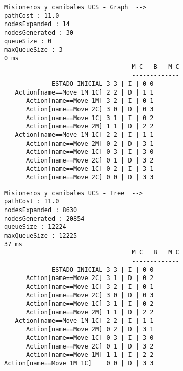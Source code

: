 \documentclass{article}
\begin{document}
\begin{multicols}{2}


\begin{Verbatim}[fontsize=\footnotesize]
Misioneros y canibales UCS - Graph  -->
pathCost : 11.0
nodesExpanded : 14
nodesGenerated : 30
queueSize : 0
maxQueueSize : 3
0 ms
                                   M C   B   M C
                                   -------------
             ESTADO INICIAL	3 3 | I | 0 0
   Action[name==Move 1M 1C]	2 2 | D | 1 1
      Action[name==Move 1M]	3 2 | I | 0 1
      Action[name==Move 2C]	3 0 | D | 0 3
      Action[name==Move 1C]	3 1 | I | 0 2
      Action[name==Move 2M]	1 1 | D | 2 2
   Action[name==Move 1M 1C]	2 2 | I | 1 1
      Action[name==Move 2M]	0 2 | D | 3 1
      Action[name==Move 1C]	0 3 | I | 3 0
      Action[name==Move 2C]	0 1 | D | 3 2
      Action[name==Move 1C]	0 2 | I | 3 1
      Action[name==Move 2C]	0 0 | D | 3 3
\end{Verbatim}
        
\begin{Verbatim}[fontsize=\footnotesize]
Misioneros y canibales UCS - Tree  -->
pathCost : 11.0
nodesExpanded : 8630
nodesGenerated : 20854
queueSize : 12224
maxQueueSize : 12225
37 ms
                                   M C   B   M C
                                   -------------
             ESTADO INICIAL	3 3 | I | 0 0
      Action[name==Move 2C]	3 1 | D | 0 2
      Action[name==Move 1C]	3 2 | I | 0 1
      Action[name==Move 2C]	3 0 | D | 0 3
      Action[name==Move 1C]	3 1 | I | 0 2
      Action[name==Move 2M]	1 1 | D | 2 2
   Action[name==Move 1M 1C]	2 2 | I | 1 1
      Action[name==Move 2M]	0 2 | D | 3 1
      Action[name==Move 1C]	0 3 | I | 3 0
      Action[name==Move 2C]	0 1 | D | 3 2
      Action[name==Move 1M]	1 1 | I | 2 2
Action[name==Move 1M 1C]	0 0 | D | 3 3
\end{Verbatim}

\end{multicols}
\end{document}
